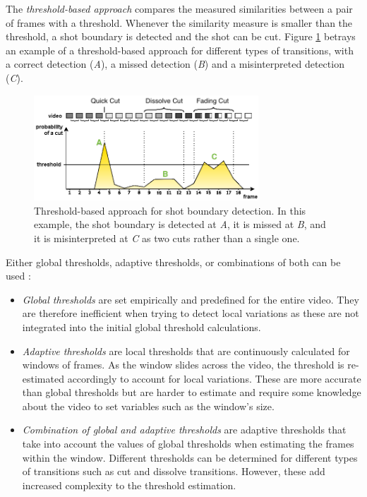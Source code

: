 The \textit{threshold-based approach} compares the measured similarities between a pair of frames with a threshold. Whenever the similarity measure is smaller than the threshold, a shot boundary is detected and the shot can be cut. Figure \ref{fig:shot_boundary_detection_threshold} betrays an example of a threshold-based approach for different types of transitions, with a correct detection (\emph{A}), a missed detection (\emph{B}) and a misinterpreted detection (\emph{C}).\\

\begin{figure}[h] 
\centerline{\includegraphics[width=0.75\textwidth]{figures/litsurvey/shot_boundary_detection_threshold.png}}
\caption{\label{fig:shot_boundary_detection_threshold}Threshold-based approach for shot boundary detection. In this example, the shot boundary is detected at \emph{A}, it is missed at \emph{B}, and it is misinterpreted at \emph{C} as two cuts rather than a single one.}
\end{figure}

Either global thresholds, adaptive thresholds, or combinations of both can be used \cite{cernekova2006information} \cite{hu2011survey}:
\begin{itemize}
    \item \textit{Global thresholds} are set empirically and predefined for the entire video. They are therefore inefficient when trying to detect local variations as these are not integrated into the initial global threshold calculations.
    \item \textit{Adaptive thresholds} are local thresholds that are continuously calculated for windows of frames. As the window slides across the video, the threshold is re-estimated accordingly to account for local variations. These are more accurate than global thresholds but are harder to estimate and require some knowledge about the video to set variables such as the window's size.
    \item \textit{Combination of global and adaptive thresholds} are adaptive thresholds that take into account the values of global thresholds when estimating the frames within the window. Different thresholds can be determined for different types of transitions such as cut and dissolve transitions. However, these add increased complexity to the threshold estimation.
\end{itemize}

